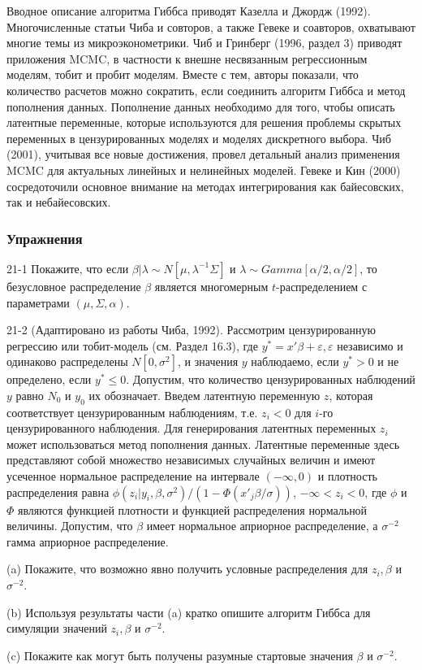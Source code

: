 Вводное описание алгоритма Гиббса приводят Казелла и Джордж (1992). Многочисленные статьи Чиба и совторов, а также Гевеке и соавторов, охватывают многие темы из микроэконометрики. Чиб и Гринберг (1996, раздел 3) приводят приложения MCMC, в частности к внешне несвязанным регрессионным моделям, тобит и пробит моделям. Вместе с тем, авторы показали, что количество расчетов можно сократить, если соединить алгоритм Гиббса и метод пополнения данных. 
Пополнение данных необходимо для того, чтобы описать латентные переменные, которые используются для решения проблемы скрытых переменных в цензурированных моделях и моделях дискретного выбора. Чиб (2001), учитывая все новые достижения, провел детальный анализ применения MCMC для актуальных линейных и нелинейных моделей. Гевеке и Кин (2000) сосредоточили основное внимание на методах интегрирования как байесовских, так и небайесовских.


\subsubsection*{Упражнения}

21-1 Покажите, что если $\beta|\lambda{\sim}N[\mu,\lambda^{-1}\Sigma]$ и $\lambda{\sim}Gamma[\alpha/2,\alpha/2]$, то безусловное распределение $\beta$ является многомерным $t$-распределением с параметрами $(\mu,\Sigma,\alpha)$.

21-2 (Адаптировано из работы Чиба, 1992). Рассмотрим цензурированную регрессию или тобит-модель (см. Раздел 16.3), где $y^{*}=x'\beta+\varepsilon, \varepsilon$ независимо и одинаково распределены ${N[0,\sigma^{2}]}$, и значения $y$ наблюдаемо, если $y^{*}>0$ и не определено, если $y^{*}{\leq}0$. Допустим, что количество цензурированных наблюдений $y$ равно $N_0$ и $y_0$ их обозначает. Введем латентную переменную $z$, которая соответствует цензурированным наблюдениям, т.е. $z_{i}<0$ для $i$-го цензурированного наблюдения. Для генерирования латентных переменных $z_i$ может использоваться метод пополнения данных. Латентные переменные здесь представляют собой множество независимых случайных величин и имеют усеченное нормальное распределение на интервале $(-\infty,0)$ и плотность распределения  равна $\phi(z_i|y_i,\beta,\sigma^2)/(1-\Phi(x'_{j}\beta/\sigma))$, $-\infty<z_i<0$, где $\phi$ и $\Phi$ являются функцией плотности и функцией распределения  нормальной величины. Допустим, что $\beta$ имеет нормальное априорное распределение, а $\sigma^{-2}$ гамма априорное распределение.

(a) Покажите, что возможно явно получить условные распределения для $z_i,\beta$ и $\sigma^{-2}$.

(b) Используя результаты части (a) кратко опишите алгоритм Гиббса для симуляции значений $z_i, \beta$ и $\sigma^{-2}$.

(c) Покажите как могут быть получены разумные стартовые значения $\beta$ и $\sigma^{-2}$. 


